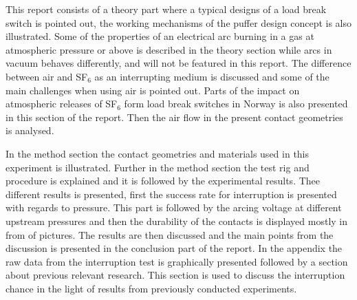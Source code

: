 \documentclass[10pt,a4paper]{article}
\begin{document}
This report consists of a theory part where a typical designs of a load break switch is pointed out, the working mechanisms of the puffer design concept is also illustrated. Some of the properties of an electrical arc burning in a gas at atmospheric pressure or above is described in the theory section while arcs in vacuum behaves differently, and will not be featured in this report. The difference between air and SF$_6$ as an interrupting medium is discussed and some of the main challenges when using air is pointed out. Parts of the impact on atmospheric releases of SF$_6$ form load break switches in Norway is also presented in this section of the report. Then the air flow in the present contact geometries is analysed.

In the method section the contact geometries and materials used in this experiment is illustrated. Further in the method section the test rig and procedure is explained and it is followed by the experimental results. Thee different results is presented, first the success rate for interruption is presented with regards to pressure. This part is followed by the arcing voltage at different upstream pressures and then the durability of the contacts is displayed mostly in from of pictures. The results are then discussed and the main points from the discussion is presented in the conclusion part of the report. In the appendix the raw data from the interruption test is graphically presented followed by a section about previous relevant research. This section is used to discuss the interruption chance in the light of results from previously conducted experiments.
\end{document}
